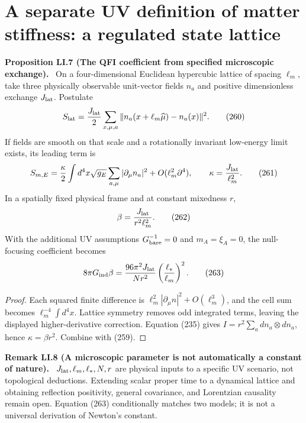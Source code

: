 \documentclass[11pt,a4paper,oneside]{book}
\newcommand{\statement}[3]{\par\medskip\noindent\textbf{#1 #2 (#3).}\ }
\begin{document}
\section{A separate UV definition of matter stiffness: a regulated state lattice}
\statement{Proposition}{LI.7}{The QFI coefficient from specified microscopic exchange}
On a four-dimensional Euclidean hypercubic lattice of spacing $\ell_m$, take three physically observable unit-vector fields $n_a$ and positive dimensionless exchange $J_{\rm lat}$. Postulate
\begin{equation}S_{\rm lat}=\frac{J_{\rm lat}}2\sum_{x,\mu,a}\|n_a(x+\ell_m\widehat\mu)-n_a(x)\|^2.\tag{260}\end{equation}
If fields are smooth on that scale and a rotationally invariant low-energy limit exists, its leading term is
\begin{equation}S_{m,E}=\frac\kappa2\int d^4x\sqrt{g_E}\sum_{a,\mu}|\partial_\mu n_a|^2+O(\ell_m^2\partial^4),\qquad\kappa=\frac{J_{\rm lat}}{\ell_m^2}.\tag{261}\end{equation}
In a spatially fixed physical frame and at constant mixedness $r$,
\begin{equation}\beta=\frac{J_{\rm lat}}{r^2\ell_m^2}.\tag{262}\end{equation}
With the additional UV assumptions $G_{\rm bare}^{-1}=0$ and $m_A=\xi_A=0$, the null-focusing coefficient becomes
\begin{equation}8\pi G_{\rm ind}\beta=\frac{96\pi^2J_{\rm lat}}{Nr^2}\left(\frac{\ell_*}{\ell_m}\right)^2.\tag{263}\end{equation}
\begin{proof}
Each squared finite difference is $\ell_m^2|\partial_\mu n|^2+O(\ell_m^3)$, and the cell sum becomes $\ell_m^{-4}\int d^4x$. Lattice symmetry removes odd integrated terms, leaving the displayed higher-derivative correction. Equation (235) gives $I=r^2\sum_a dn_a\otimes dn_a$, hence $\kappa=\beta r^2$. Combine with (259).
\end{proof}
\statement{Remark}{LI.8}{A microscopic parameter is not automatically a constant of nature}
$J_{\rm lat},\ell_m,\ell_*,N,r$ are physical inputs to a specific UV scenario, not topological deductions. Extending scalar proper time to a dynamical lattice and obtaining reflection positivity, general covariance, and Lorentzian causality remain open. Equation (263) conditionally matches two models; it is not a universal derivation of Newton's constant.
\end{document}
